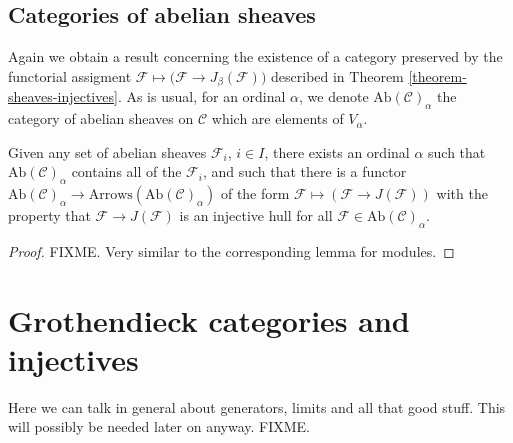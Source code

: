 \subsection{Categories of abelian sheaves}
\label{subsection-abelian-sheaves}

\noindent
Again we obtain a result concerning the existence of a category 
preserved by the functorial assigment $\mathcal{F} \mapsto
\big(\mathcal{F} \to J_\beta(\mathcal{F})\big)$ described in
Theorem \ref{theorem-sheaves-injectives}. As is usual, for an
ordinal $\alpha$, we denote $\text{Ab}(\mathcal{C})_\alpha$ the
category of abelian sheaves on $\mathcal{C}$ which are elements
of $V_\alpha$.

\begin{lemma}
\label{lemma-injective-sheaf-preserves-category}
Given any set of abelian sheaves $\mathcal{F}_i$, $i\in I$, there
exists an ordinal $\alpha$ such that $\text{Ab}(\mathcal{C})_\alpha$
contains all of the $\mathcal{F}_i$, and such that there is a functor
$\text{Ab}(\mathcal{C})_\alpha \to
\text{Arrows}(\text{Ab}(\mathcal{C})_\alpha)$
of the form $\mathcal{F} \mapsto (\mathcal{F} \to J(\mathcal{F}))$
with the property that $\mathcal{F} \to J(\mathcal{F})$ is an injective
hull for all $\mathcal{F} \in \text{Ab}(\mathcal{C})_\alpha$.
\end{lemma}

\begin{proof}
FIXME. Very similar to the corresponding lemma for modules.
\end{proof}

\section{Grothendieck categories and injectives}

\noindent
Here we can talk in general about generators, limits and
all that good stuff. This will possibly be needed later on
anyway. FIXME.









